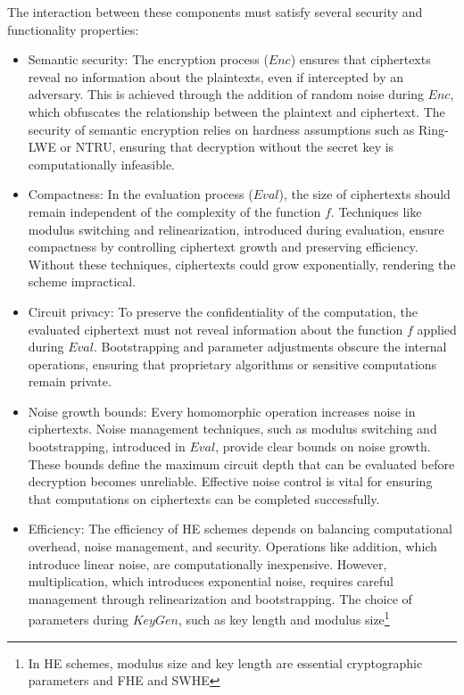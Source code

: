 \documentclass[
  letterpaper,
  DIV=11,
  numbers=noendperiod,
  oneside]{scrartcl}
\begin{document}
The interaction between these components must satisfy several security
and functionality properties:

\begin{itemize}
\item
  Semantic security: The encryption process (\(Enc\)) ensures that
  ciphertexts reveal no information about the plaintexts, even if
  intercepted by an adversary. This is achieved through the addition of
  random noise during \(Enc\), which obfuscates the relationship between
  the plaintext and ciphertext. The security of semantic encryption
  relies on hardness assumptions such as Ring-LWE or NTRU, ensuring that
  decryption without the secret key is computationally infeasible.
\item
  Compactness: In the evaluation process (\(Eval\)), the size of
  ciphertexts should remain independent of the complexity of the
  function \(f\). Techniques like modulus switching and relinearization,
  introduced during evaluation, ensure compactness by controlling
  ciphertext growth and preserving efficiency. Without these techniques,
  ciphertexts could grow exponentially, rendering the scheme
  impractical.
\item
  Circuit privacy: To preserve the confidentiality of the computation,
  the evaluated ciphertext must not reveal information about the
  function \(f\) applied during \(Eval\). Bootstrapping and parameter
  adjustments obscure the internal operations, ensuring that proprietary
  algorithms or sensitive computations remain private.
\item
  Noise growth bounds: Every homomorphic operation increases noise in
  ciphertexts. Noise management techniques, such as modulus switching
  and bootstrapping, introduced in \(Eval\), provide clear bounds on
  noise growth. These bounds define the maximum circuit depth that can
  be evaluated before decryption becomes unreliable. Effective noise
  control is vital for ensuring that computations on ciphertexts can be
  completed successfully.
\item
  Efficiency: The efficiency of HE schemes depends on balancing
  computational overhead, noise management, and security. Operations
  like addition, which introduce linear noise, are computationally
  inexpensive. However, multiplication, which introduces exponential
  noise, requires careful management through relinearization and
  bootstrapping. The choice of parameters during \(KeyGen\), such as key
  length and modulus size\footnote{In HE schemes, modulus size and key
    length are essential cryptographic parameters and FHE and SWHE
}
\end{itemize}
\end{document}
